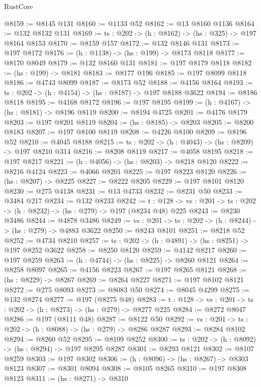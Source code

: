 \begin{lexlean}{RustCore}
\begin{coremodule}
@8159 := @8145 @131
@8160 := @1133 @52
@8162 := @13 @8160 @1136
@8164 := @132 @8132 @131
@8169 := {ts : @202} -> (h : @8162) -> (hs : @325) -> @197 @8164 @8153
@8170 := @8159 @157
@8172 := @132 @8146 @131
@8173 := @197 @8172
@8176 := (h : @1138) -> (hs : @199) -> @8173 @8118
@8177 := @8170 @8049
@8179 := @132 @8160 @131
@8181 := @197 @8179 @8118
@8182 := (hs : @199) -> @8181
@8183 := @8177 @196
@8185 := @197 @8099 @8118
@8186 := @4743 @8099
@8187 := @8173 @52
@8188 := @4156 @8164
@8193 := {ts : @202} -> (h : @4154) -> (hs : @8187) -> @197 @8188 @3622
@8194 := @8186 @8118
@8195 := @4168 @8172
@8196 := @197 @8195
@8199 := (h : @4167) -> (hs : @8181) -> @8196 @8119
@8200 := @8194 @4725
@8201 := @4176 @8179
@8203 := @197 @8201 @8119
@8204 := (hs : @8185) -> @8203
@8205 := @8200 @8183
@8207 := @197 @8100 @8119
@8208 := @4226 @8100
@8209 := @8196 @52
@8210 := @4045 @8188
@8215 := {ts : @202} -> (h : @4043) -> (hs : @8209) -> @197 @8210 @314
@8216 := @8208 @8119
@8217 := @4058 @8195
@8218 := @197 @8217
@8221 := (h : @4056) -> (hs : @8203) -> @8218 @8120
@8222 := @8216 @4124
@8223 := @4066 @8201
@8225 := @197 @8223 @8120
@8226 := (hs : @8207) -> @8225
@8227 := @8222 @8205
@8229 := @197 @8101 @8120
@8230 := @275 @4138
@8231 := @13 @4733
@8232 := @8231 @50
@8233 := @3484 @217
@8234 := @132 @8233
@8242 := {t : @128} ->
  {vs : @201} -> {ts : @202} -> (h : @8232) -> (hs : @279) -> @197 (@8234 @48) @225
@8243 := @8230 @3486
@8244 := @4878 @3486
@8249 := {vs : @201} -> {ts : @202} -> (h : @8244) -> (hs : @279) -> @4883 @3622
@8250 := @8243 @8101
@8251 := @8218 @52
@8252 := @4734 @8210
@8257 := {ts : @202} -> (h : @4891) -> (hs : @8251) -> @197 @8252 @3622
@8258 := @8250 @8120
@8259 := @4142 @8217
@8260 := @197 @8259
@8263 := (h : @4744) -> (hs : @8225) -> @8260 @8121
@8264 := @8258 @8097
@8265 := @4156 @8223
@8267 := @197 @8265 @8121
@8268 := (hs : @8229) -> @8267
@8269 := @8264 @8227
@8271 := @197 @8102 @8121
@8272 := @275 @8093
@8273 := @8083 @50
@8274 := @8045 @4299
@8275 := @132 @8274
@8277 := @197 (@8275 @48)
@8283 := {t : @128} -> {vs : @201} -> {ts : @202} -> (h : @8273) -> (hs : @279) -> @8277 @225
@8284 := @8272 @8047
@8286 := @197 (@8111 @48)
@8287 := @8122 @50
@8292 := {vs : @201} -> {ts : @202} -> (h : @8088) -> (hs : @279) -> @8286 @8287
@8293 := @8284 @8102
@8294 := @8260 @52
@8295 := @8109 @8252
@8300 := {ts : @202} -> (h : @8092) -> (hs : @8294) -> @197 @8295 @8287
@8301 := @8293 @8121
@8302 := @8107 @8259
@8303 := @197 @8302
@8306 := (h : @8096) -> (hs : @8267) -> @8303 @8123
@8307 := @8301 @8094
@8308 := @8105 @8265
@8310 := @197 @8308 @8123
@8311 := (hs : @8271) -> @8310

\end{coremodule}
\end{lexlean}
